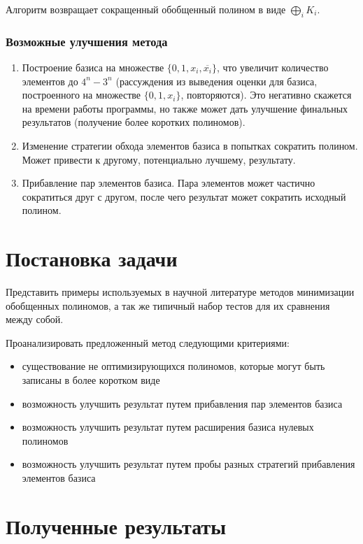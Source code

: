 \documentclass[a4paper,12pt,titlepage,finall]{article}
\begin{document}
Алгоритм возвращает сокращенный обобщенный полином в виде $ \bigoplus\limits_i K_i $.

\subsubsection*{Возможные улучшения метода}

\begin{enumerate}
    \item Построение базиса на множестве $ \{ 0, 1, x_i, \overline{x_i} \} $, что увеличит количество элементов до $ 4^n - 3^n $ (рассуждения из выведения оценки для базиса, построенного на множестве $ \{ 0, 1, x_i \} $, повторяются). Это негативно скажется на времени работы программы, но также может дать улучшение финальных результатов (получение более коротких полиномов).
    \item Изменение стратегии обхода элементов базиса в попытках сократить полином. Может привести к другому, потенциально лучшему, результату.
    \item Прибавление пар элементов базиса. Пара элементов может частично сократиться друг с другом, после чего результат может сократить исходный полином.
\end{enumerate}

\section{Постановка задачи}

Представить примеры используемых в научной литературе методов минимизации обобщенных полиномов, а так же типичный набор тестов для их сравнения между собой.

Проанализировать предложенный метод следующими критериями:
\begin{itemize}
    \item существование не оптимизирующихся полиномов, которые могут быть записаны в более коротком виде
    \item возможность улучшить результат путем прибавления пар элементов базиса
    \item возможность улучшить результат путем расширения базиса нулевых полиномов
    \item возможность улучшить результат путем пробы разных стратегий прибавления элементов базиса
\end{itemize}

\section{Полученные результаты}
\end{document}

